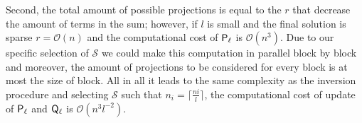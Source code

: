 {Second, the total amount of possible projections is equal to the $r$ that decrease the amount of terms in the sum; however, if $l$ is small and the final solution is sparse $r=\mathcal{O}(n)$ and the computational cost of ${\mathsf{P}}_\ell$ is $\mathcal{O}(n^3)$. Due to our specific selection of $\mathcal{S}$ we could make this computation in parallel block by block and moreover, the amount of projections to be considered for every block is at most the size of block. All in all it leads to the same complexity as the inversion procedure and selecting $\mathcal{S}$ such that $n_i = \lceil
\frac{ni}{l}\rceil$, the computational cost of update of ${\mathsf{P}}_\ell$ and ${\mathsf{Q}}_\ell$ is $\mathcal{O}(n^3l^{-2})$.
}